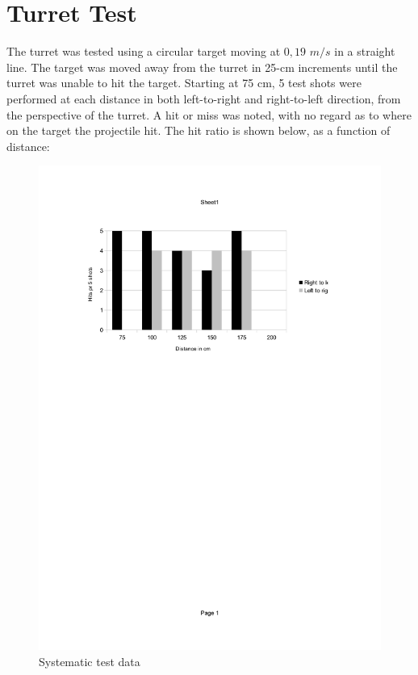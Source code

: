\section{Turret Test}
The turret was tested using a circular target moving at $0,19$ $m/s$ in a straight line. 
The target was moved away from the turret in 25-cm increments until the turret was unable to hit the target. Starting at 75 cm, 5 test shots were performed at each distance in both left-to-right and right-to-left direction, from the perspective of the turret. A hit or miss was noted, with no regard as to where on the target the projectile hit. The hit ratio is shown below, as a function of distance:

\begin{figure}[hbtp]
	\includegraphics[scale=0.5]{img/test.pdf}
	\caption{Systematic test data}
	\label{systest}
\end{figure}


